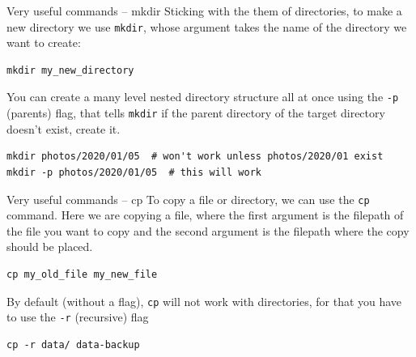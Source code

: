 \documentclass[10pt]{beamer}
\begin{document}
\begin{frame}[label={sec:org575e404},fragile]{Very useful commands -- mkdir}
 Sticking with the them of directories, to make a new directory we use \texttt{mkdir},
whose argument takes the name of the directory we want to create:

\begin{verbatim}
mkdir my_new_directory
\end{verbatim}

You can create a many level nested directory structure all at once using the \texttt{-p}
(parents) flag, that tells \texttt{mkdir} if the parent directory of the target directory
doesn't exist, create it.

\begin{verbatim}
mkdir photos/2020/01/05  # won't work unless photos/2020/01 exist
mkdir -p photos/2020/01/05  # this will work
\end{verbatim}
\end{frame}

\begin{frame}[label={sec:org3ede544},fragile]{Very useful commands -- cp}
 To copy a file or directory, we can use the \texttt{cp} command. Here we are copying a
file, where the first argument is the filepath of the file you want to copy and the second
argument is the filepath where the copy should be placed.

\begin{verbatim}
cp my_old_file my_new_file
\end{verbatim}

By default (without a flag), \texttt{cp} will not work with directories, for that you
have to use the \texttt{-r} (recursive) flag

\begin{verbatim}
cp -r data/ data-backup
\end{verbatim}
\end{frame}
\end{document}
